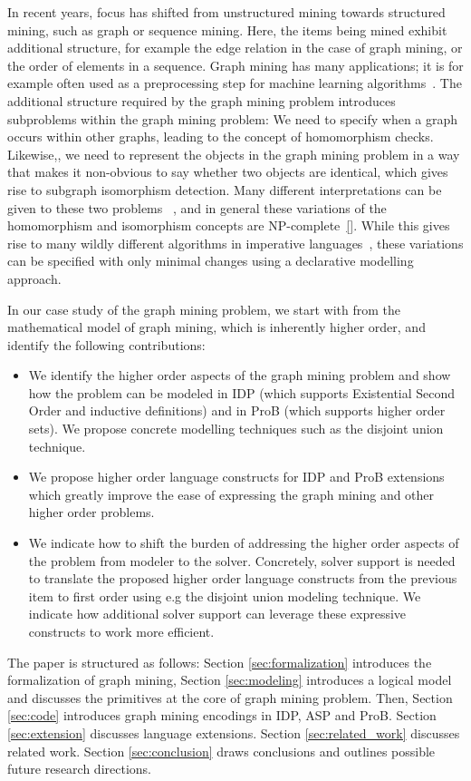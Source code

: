 In recent years, focus has shifted from unstructured mining towards structured mining, such as graph or sequence mining.
Here, the items being mined exhibit additional structure, for example the edge relation in the case of graph mining, or the order of elements in a sequence.
Graph mining has many applications; it is for example often used as a preprocessing step for machine learning algorithms~\citep{pattern_mining_classification}.
The additional structure required by the graph mining problem introduces subproblems within the graph mining problem: We need to specify when a graph occurs within other graphs, leading to the concept of homomorphism checks.
Likewise,, we need to represent the objects in the graph mining problem in a way that makes it non-obvious to say whether two objects are identical, which gives rise to subgraph isomorphism detection.
Many different interpretations can be given to these two problems~ \citep{subtree_overview}, and in general these variations of the homomorphism and isomorphism concepts are NP-complete~\ref{}.
While this gives rise to many wildly different algorithms in imperative languages~\citep{gspan,theta_subsumption}, these variations can be specified with only minimal changes using a declarative modelling approach.

In our case study of the graph mining problem, we start with from the mathematical model of graph mining, which is inherently higher order, and identify the following contributions:
\begin{itemize}
\item We identify the higher order aspects of the graph mining problem and show how the problem can be modeled in IDP (which supports Existential Second Order and inductive definitions) and in ProB (which supports higher order sets). We propose concrete modelling techniques such as the disjoint union technique.
\item We propose higher order language constructs for IDP and ProB extensions which greatly improve the ease of expressing the graph mining and other higher order problems.
\item We indicate how to shift the burden of addressing the higher order aspects of the problem from modeler to the solver. 
Concretely, solver support is needed to translate the proposed higher order language constructs from the previous item to first order using e.g the disjoint union modeling technique.
We indicate how additional solver support can leverage these expressive constructs to work more efficient.
\end{itemize}
The paper is structured as follows: Section \ref{sec:formalization} introduces the formalization of graph mining, Section \ref{sec:modeling} introduces a logical model and discusses the primitives at the core of graph mining problem.
Then, Section \ref{sec:code} introduces graph mining encodings in IDP, ASP and ProB. Section \ref{sec:extension} discusses language extensions.
Section \ref{sec:related_work} discusses related work. Section \ref{sec:conclusion} draws conclusions and outlines possible future research directions.